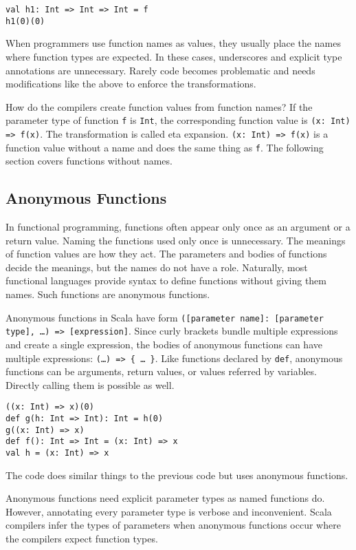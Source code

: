 \begin{verbatim}
val h1: Int => Int => Int = f
h1(0)(0)
\end{verbatim}

When programmers use function names as values, they usually place the names where
function types are expected. In these cases, underscores and explicit type
annotations are unnecessary. Rarely code becomes problematic and needs
modifications like the above to enforce the transformations.

How do the compilers create function values from function names? If the parameter
type of function \verb!f! is \verb!Int!, the corresponding function value is
\verb!(x: Int) => f(x)!. The transformation is called eta expansion. \verb!(x: Int) => f(x)!
is a function value without a name and does the same thing as
\verb!f!. The following section covers functions without names.

\subsection{Anonymous Functions}

In functional programming, functions often appear only once as an argument or a
return value. Naming the functions used only once is unnecessary. The meanings of
function values are how they act. The parameters and bodies of functions decide
the meanings, but the names do not have a role. Naturally, most functional
languages provide syntax to define functions without giving them names. Such
functions are anonymous functions.

Anonymous functions in Scala have form \verb!([parameter name]: [parameter type], …) => [expression]!.
Since curly brackets bundle multiple expressions and create
a single expression, the bodies of anonymous functions can have multiple
expressions: \verb!(…) => { … }!. Like functions declared by \verb!def!,
anonymous functions can be arguments, return values, or values referred by
variables. Directly calling them is possible as well.

\begin{verbatim}
((x: Int) => x)(0)
def g(h: Int => Int): Int = h(0)
g((x: Int) => x)
def f(): Int => Int = (x: Int) => x
val h = (x: Int) => x
\end{verbatim}

The code does similar things to the previous code but uses anonymous functions.

Anonymous functions need explicit parameter types as named functions do. However,
annotating every parameter type is verbose and inconvenient. Scala compilers
infer the types of parameters when anonymous functions occur where the compilers
expect function types.

